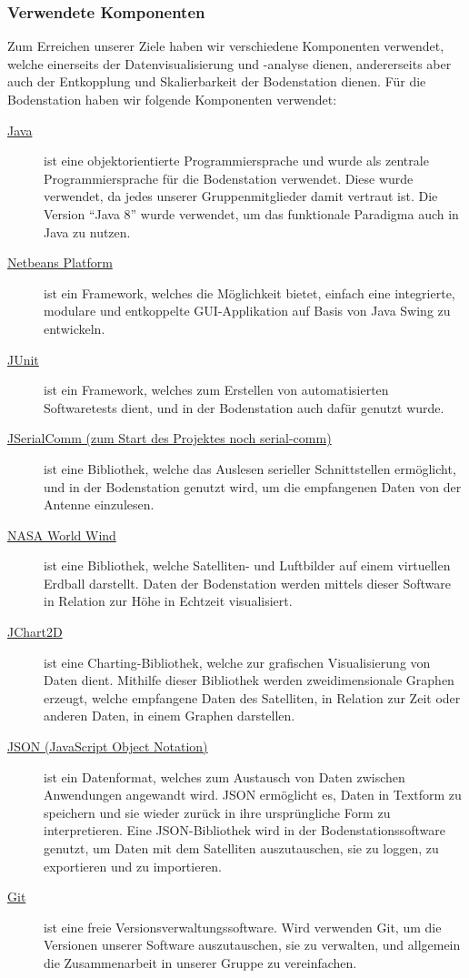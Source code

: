 \subsubsection{Verwendete Komponenten}
Zum Erreichen unserer Ziele haben wir verschiedene Komponenten verwendet, welche einerseits der Datenvisualisierung und -analyse dienen, andererseits aber auch der Entkopplung und Skalierbarkeit der Bodenstation dienen.
Für die Bodenstation haben wir folgende Komponenten verwendet:
\begin{description}
	\item[\href{http://www.oracle.com/technetwork/java/javase/downloads/jdk8-downloads-2133151.html}{Java}] ist eine objektorientierte Programmiersprache und wurde als zentrale Programmiersprache für die Bodenstation verwendet. Diese wurde verwendet, da jedes unserer Gruppenmitglieder damit vertraut ist. Die Version ``Java 8'' wurde verwendet, um das funktionale Paradigma auch in Java zu nutzen.
	\item[\href{https://netbeans.org/features/platform/}{Netbeans Platform}] ist ein Framework, welches die Möglichkeit bietet, einfach eine integrierte, modulare und entkoppelte GUI-Applikation auf Basis von Java Swing zu entwickeln.
	\item[\href{http://junit.org/}{JUnit}] ist ein Framework, welches zum Erstellen von automatisierten Softwaretests dient, und in der Bodenstation auch dafür genutzt wurde.
	\item[\href{http://fazecast.github.io/jSerialComm/}{JSerialComm (zum Start des Projektes noch serial-comm)}] ist eine Bibliothek, welche das Auslesen serieller Schnittstellen ermöglicht, und in der Bodenstation genutzt wird, um die empfangenen Daten von der Antenne einzulesen.
	\item[\href{http://worldwind.arc.nasa.gov/java/}{NASA World Wind}] ist eine Bibliothek, welche Satelliten- und Luftbilder auf einem virtuellen Erdball darstellt. Daten der Bodenstation werden mittels dieser Software in Relation zur Höhe in Echtzeit visualisiert.
	\item[\href{http://jchart2d.sourceforge.net/}{JChart2D}] ist eine Charting-Bibliothek, welche zur grafischen Visualisierung von Daten dient. Mithilfe dieser Bibliothek werden zweidimensionale Graphen erzeugt, welche empfangene Daten des Satelliten, in Relation zur Zeit oder anderen Daten, in einem Graphen darstellen.
	\item[\href{http://www.json.org/}{JSON (JavaScript Object Notation)}] ist ein Datenformat, welches zum Austausch von Daten zwischen Anwendungen angewandt wird. JSON ermöglicht es, Daten in Textform zu speichern und sie wieder zurück in ihre ursprüngliche Form zu interpretieren. Eine JSON-Bibliothek wird in der Bodenstationssoftware genutzt, um Daten mit dem Satelliten auszutauschen, sie zu loggen, zu exportieren und zu importieren.
	\item[\href{http://git-scm.com/}{Git}] ist eine freie Versionsverwaltungssoftware. Wird verwenden Git, um die Versionen unserer Software auszutauschen, sie zu verwalten, und allgemein die Zusammenarbeit in unserer Gruppe zu vereinfachen.
\end{description}